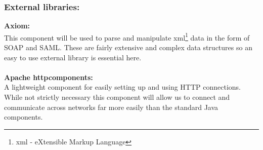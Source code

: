     \subsubsection{External libraries:}
\indent \indent \textbf{Axiom:}\\
This component will be used to parse and manipulate \gls{xml}\footnote{\gls{xml} - eXtensible Markup Language} data in the form of SOAP and SAML. These are fairly extensive and complex data structures so an easy to use external library is essential here.
\\\\

\indent \textbf{Apache \gls{httpcomponents}:}\\
A lightweight component for easily setting up and using HTTP connections. While not strictly necessary this component will allow us to connect and communicate across networks far more easily than the standard Java components.

